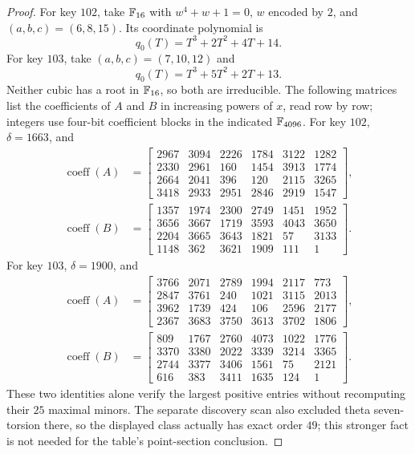 \begin{proof}
For key $102$, take $\mathbb F_{16}$ with
$w^4+w+1=0$, $w$ encoded by $2$, and
$(a,b,c)=(6,8,15)$. Its coordinate polynomial is
\[
                         q_0(T)=T^3+2T^2+4T+14.
\]
For key $103$, take $(a,b,c)=(7,10,12)$ and
\[
                         q_0(T)=T^3+5T^2+2T+13.
\]
Neither cubic has a root in $\mathbb F_{16}$, so both
are irreducible. The following matrices list
the coefficients of $A$ and $B$ in increasing
powers of $x$, read row by row; integers use
four-bit coefficient blocks in the indicated
$\mathbb F_{4096}$.
For key $102$, $\delta=1663$, and
\[
\begin{aligned}
\operatorname{coeff}(A)&=\left[\begin{matrix}
2967 & 3094 & 2226 & 1784 & 3122 & 1282\\
2330 & 2961 & 160 & 1454 & 3913 & 1774\\
2664 & 2041 & 396 & 120 & 2115 & 3265\\
3418 & 2933 & 2951 & 2846 & 2919 & 1547
\end{matrix}\right],\\[3pt]
\operatorname{coeff}(B)&=\left[\begin{matrix}
1357 & 1974 & 2300 & 2749 & 1451 & 1952\\
3656 & 3667 & 1719 & 3593 & 4043 & 3650\\
2204 & 3665 & 3643 & 1821 & 57 & 3133\\
1148 & 362 & 3621 & 1909 & 111 & 1
\end{matrix}\right].
\end{aligned}
\]
For key $103$, $\delta=1900$, and
\[
\begin{aligned}
\operatorname{coeff}(A)&=\left[\begin{matrix}
3766 & 2071 & 2789 & 1994 & 2117 & 773\\
2847 & 3761 & 240 & 1021 & 3115 & 2013\\
3962 & 1739 & 424 & 106 & 2596 & 2177\\
2367 & 3683 & 3750 & 3613 & 3702 & 1806
\end{matrix}\right],\\[3pt]
\operatorname{coeff}(B)&=\left[\begin{matrix}
809 & 1767 & 2760 & 4073 & 1022 & 1776\\
3370 & 3380 & 2022 & 3339 & 3214 & 3365\\
2744 & 3377 & 3406 & 1561 & 75 & 2121\\
616 & 383 & 3411 & 1635 & 124 & 1
\end{matrix}\right].
\end{aligned}
\]
These two identities alone verify the largest
positive entries without recomputing their
$25$ maximal minors. The separate discovery
scan also excluded theta seven-torsion there,
so the displayed class actually has exact
order $49$; this stronger fact is not needed
for the table's point-section conclusion.


\end{proof}

